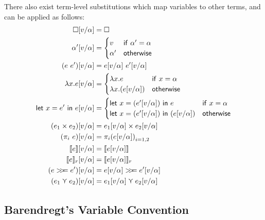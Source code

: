 There also exist term-level substitutions which map variables to
other terms, and can be applied as follows:
\begin{align*}
  \square [v/\alpha] &= \square \\
  \alpha' [v/\alpha] &=
             \begin{cases}
               v & \mathsf{if} \ \alpha' = \alpha \\
               \alpha' & \mathsf{otherwise}
             \end{cases} \\
  (e \ e') [v/\alpha] &= e[v/\alpha] \ e'[v/\alpha] \\
  \lambda x . e [v/\alpha] &=
                  \begin{cases}
                    \lambda x . e & \mathsf{if} \ x = \alpha \\
                    \lambda x . (e [v/\alpha]) & \mathsf{otherwise}
                  \end{cases} \\
  \letin{x = e'}{e} [v/\alpha] &=
                               \begin{cases}
                                 \letin{x = (e' [v/\alpha])}{e} & \mathsf{if} \
                                 x = \alpha \\
                                 \letin{x = (e' [v/\alpha])}{(e [v/\alpha])}
                                 & \mathsf{otherwise}
                               \end{cases} \\  
  (e_1 \times e_2) [v/\alpha] &= e_1[v/\alpha] \times e_2[v/\alpha] \\
  (\pi_i \ e) [v/\alpha] &= {\pi_i (e [v/\alpha])}_{i = 1, 2} \\
  \lift{e} [v/\alpha] &= \lift{e[v/\alpha]} \\
  \use{r}{e} [v/\alpha] &= \use{r}{e[v/\alpha]} \\
  (e \bind e') [v/\alpha] &= e[v/\alpha] \bind e'[v/\alpha] \\
  (e_1 \curlyvee e_2) [v/\alpha] &= e_1[v/\alpha] \curlyvee e_2 [v/\alpha]
\end{align*}

\subsection{Barendregt's Variable Convention}

